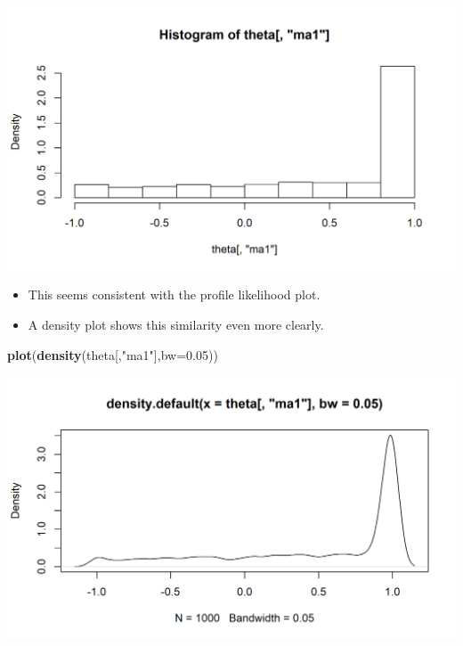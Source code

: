 \documentclass[]{article}
\newenvironment{Shaded}{\begin{snugshade}}{\end{snugshade}}
\newcommand{\KeywordTok}[1]{\textcolor[rgb]{0.13,0.29,0.53}{\textbf{#1}}}
\newcommand{\DataTypeTok}[1]{\textcolor[rgb]{0.13,0.29,0.53}{#1}}
\newcommand{\FloatTok}[1]{\textcolor[rgb]{0.00,0.00,0.81}{#1}}
\newcommand{\StringTok}[1]{\textcolor[rgb]{0.31,0.60,0.02}{#1}}
\newcommand{\NormalTok}[1]{#1}
\begin{document}
\begin{center}\includegraphics{figure/intro-simA-1} \end{center}

\begin{itemize}
\item
  This seems consistent with the profile likelihood plot.
\item
  A density plot shows this similarity even more clearly.
\end{itemize}

\begin{Shaded}
\begin{Highlighting}[]
\KeywordTok{plot}\NormalTok{(}\KeywordTok{density}\NormalTok{(theta[,}\StringTok{"ma1"}\NormalTok{],}\DataTypeTok{bw=}\FloatTok{0.05}\NormalTok{))}
\end{Highlighting}
\end{Shaded}

\begin{center}\includegraphics{figure/intro-density-1} \end{center}
\end{document}
